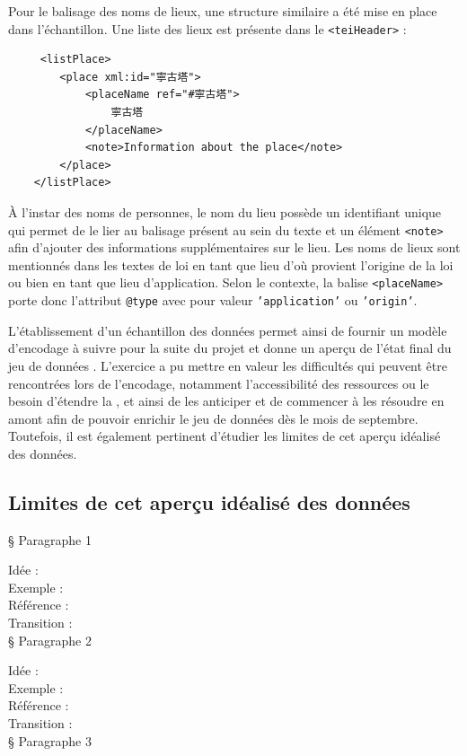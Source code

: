 Pour le balisage des noms de lieux, une structure similaire a été mise en place dans l'échantillon. Une liste des lieux est présente dans le \texttt{<teiHeader>} : 
\begin{verbatim}
     <listPlace>
        <place xml:id="寧古塔">
            <placeName ref="#寧古塔">
                寧古塔
            </placeName>
            <note>Information about the place</note>
        </place>
    </listPlace>
\end{verbatim}
À l'instar des noms de personnes, le nom du lieu possède un identifiant unique qui permet de le lier au balisage présent au sein du texte et un élément \texttt{<note>} afin d'ajouter des informations supplémentaires sur le lieu. Les noms de lieux sont mentionnés dans les textes de loi en tant que lieu d'où provient l'origine de la loi ou bien en tant que lieu d'application. Selon le contexte, la balise \texttt{<placeName>} porte donc l'attribut \texttt{@type} avec pour valeur \texttt{'application'} ou \texttt{'origin'}. 

L'établissement d'un échantillon des données permet ainsi de fournir un modèle d'encodage à suivre pour la suite du projet et donne un aperçu de l'état final du jeu de données \TEI. L'exercice a pu mettre en valeur les difficultés qui peuvent être rencontrées lors de l'encodage, notamment l'accessibilité des ressources ou le besoin d'étendre la \TEI, et ainsi de les anticiper et de commencer à les résoudre en amont afin de pouvoir enrichir le jeu de données dès le mois de septembre. Toutefois, il est également pertinent d'étudier les limites de cet aperçu idéalisé des données.

\subsection{Limites de cet aperçu idéalisé des données}

§ Paragraphe 1

Idée :\\
Exemple :\\
Référence :\\
Transition :\\

§ Paragraphe 2

Idée :\\
Exemple :\\
Référence :\\
Transition :\\

§ Paragraphe 3

